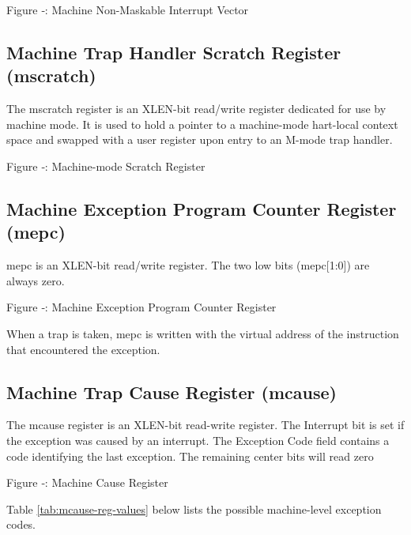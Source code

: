 \missingfigure{}

Figure ‑: Machine Non-Maskable Interrupt Vector

\subsection{Machine Trap Handler Scratch Register
(mscratch)}\label{machine-trap-handler-scratch-register-mscratch}

The mscratch register is an XLEN-bit read/write register dedicated for
use by machine mode. It is used to hold a pointer to a machine-mode
hart-local context space and swapped with a user register upon entry to
an M-mode trap handler.

\missingfigure{}

Figure ‑: Machine-mode Scratch Register

\subsection{Machine Exception Program Counter Register
(mepc)}\label{machine-exception-program-counter-register-mepc}

mepc is an XLEN-bit read/write register. The two low bits
(mepc{[}1:0{]}) are always zero.

\missingfigure{}

Figure ‑: Machine Exception Program Counter Register

When a trap is taken, mepc is written with the virtual address of the
instruction that encountered the exception.

\subsection{Machine Trap Cause Register
(mcause)}\label{machine-trap-cause-register-mcause}

The mcause register is an XLEN-bit read-write register. The Interrupt
bit is set if the exception was caused by an interrupt. The Exception
Code field contains a code identifying the last exception. The remaining
center bits will read zero

\missingfigure{}

Figure ‑: Machine Cause Register

Table \ref{tab:mcause-reg-values} below lists the possible machine-level exception codes.

